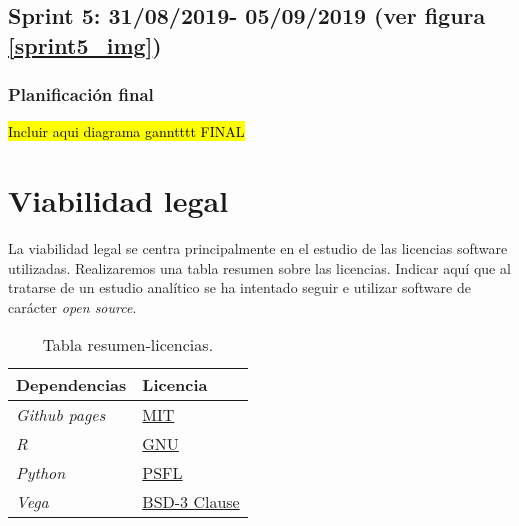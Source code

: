 \subsection{Sprint 5: 31/08/2019- 05/09/2019 (ver figura \ref{sprint5_img})}\label{sprint5}


\subsubsection{Planificación final}

\hl{Incluir aqui diagrama ganntttt FINAL}



\section{Viabilidad legal}\label{estudio-viabilidad}

La viabilidad legal se centra principalmente en el estudio de las licencias software utilizadas. Realizaremos una tabla resumen sobre las licencias. Indicar aquí que al tratarse de un estudio analítico se ha intentado seguir e utilizar software de carácter \textit{open source}.

\begin{table}[H]
	\begin{center}
		\begin{tabular}{|l|l|}
			\hline
			Dependencias & Licencia \\
			\hline \hline
			\emph{Github pages} & \href{https://opensource.org/licenses/MIT}{MIT}\\ \hline
			\emph{R} & \href{https://en.wikipedia.org/wiki/GNU_General_Public_License#Version_2}{GNU}\\ \hline
			\emph{Python} & \href{https://es.wikipedia.org/wiki/Python_Software_Foundation_License}{PSFL}\\ \hline
			\emph{Vega} & \href{https://github.com/vega/vega/blob/master/LICENSET}{BSD-3 Clause}\\ \hline
			
		\end{tabular}
		\caption{Tabla resumen-licencias.}
		\label{tabla:licencias}
	\end{center}
\end{table}




